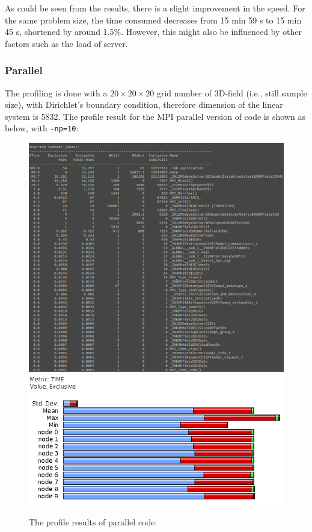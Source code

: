\documentclass{article}
\begin{document}
\begin{spacing}{1.1}
As could be seen from the results, there is a slight improvement in the speed. For the same problem size, the time consumed decreases from 15 min 59 s to 15 min 45 s, shortened by around 1.5\%. However, this might also be influenced by other factors such as the load of server.

\subsubsection{Parallel}

The profiling is done with a $ 20\times 20 \times 20$ grid number of 3D-field (i.e., still sample size), with Dirichlet's boundary condition, therefore dimension of the linear system is 5832. The profile result for the MPI parallel version of code is shown as below, with \texttt{-np=10}:

\begin{figure}[H]
  \centering
  \includegraphics[width=\linewidth]{output/mpi-previous-text.png}
  \includegraphics[width=0.6\linewidth]{output/mpi-previous.png}
  \caption{The profile results of parallel code.}
  \label{fig-testcase}
\end{figure}


\end{spacing}
\end{document}
